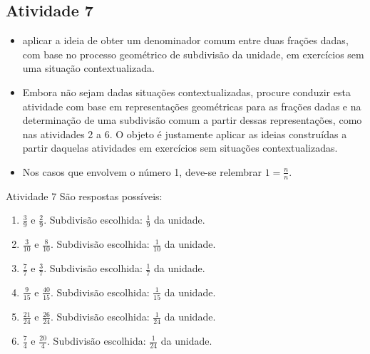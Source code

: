 \begin{multicols}{2}
\subsection{Atividade 7}

  \newline \vspace{.15cm}  

  \begin{itemize} %
    \item       aplicar a ideia de obter um denominador comum entre duas frações dadas, com base no processo geométrico de subdivisão da unidade, em exercícios sem uma situação contextualizada.
 \end{itemize} %
  
  
   \vspace{.15cm}  

  \begin{itemize} %
    \item       Embora não sejam dadas situações contextualizadas, procure conduzir esta atividade com base em representações geométricas para as frações dadas e na determinação de uma subdivisão comum a partir dessas representações, como nas atividades 2 a 6. O objeto é justamente aplicar as ideias construídas a partir daquelas atividades em exercícios sem situações contextualizadas.
    \item  Nos casos que envolvem o número 1, deve-se relembrar   $1 = \frac{n}{n}$.  
  \end{itemize} %

\begin{resposta*}{Atividade 7}  
  São respostas possíveis:   
\begin{enumerate} [\quad a)] %
    \item             $\frac{3}{9}$       e       $\frac{2}{9}$. 	Subdivisão escolhida:       $\frac{1}{9}$       da unidade.		
    \item             $\frac{3}{10}$       e       $\frac{8}{10}$.	Subdivisão escolhida:       $\frac{1}{10}$       da unidade.
    \item             $\frac{7}{7}$       e       $\frac{3}{7}$. 	Subdivisão escolhida:       $\frac{1}{7}$       da unidade.		
    \item             $\frac{9}{15}$       e       $\frac{40}{15}$.   Subdivisão escolhida:       $\frac{1}{15}$       da unidade.
    \item             $\frac{21}{24}$       e       $\frac{26}{24}$.	Subdivisão escolhida:       $\frac{1}{24}$       da unidade.	
    \item             $\frac{7}{4}$       e       $\frac{20}{4}$. 	Subdivisão escolhida:       $\frac{1}{24}$       da unidade.
\end{enumerate} %
  

\end{resposta*}
\end{multicols}
